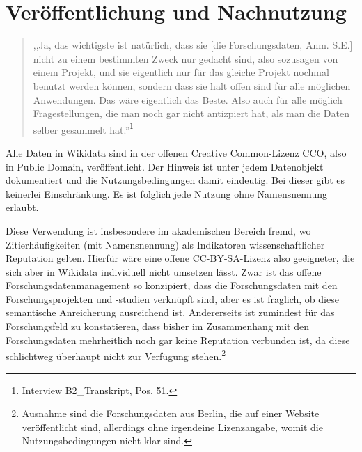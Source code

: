 \section{Veröffentlichung und Nachnutzung}

\begin{quote}
    ,,Ja, das wichtigste ist natürlich, dass sie [die Forschungsdaten, Anm. S.E.] nicht zu einem bestimmten Zweck nur gedacht sind, also sozusagen von einem Projekt, und sie eigentlich nur für das gleiche Projekt nochmal benutzt werden können, sondern dass sie halt offen sind für alle möglichen Anwendungen. Das wäre eigentlich das Beste. Also auch für alle möglich Fragestellungen, die man noch gar nicht antizpiert hat, als man die Daten selber gesammelt hat.''\footnote{Interview B2\_Transkript, Pos. 51.}
\end{quote}

Alle Daten in Wikidata sind in der offenen Creative Common-Lizenz CCO, also in Public Domain, veröffentlicht. Der Hinweis ist unter jedem Datenobjekt dokumentiert und die Nutzungsbedingungen damit eindeutig. Bei dieser gibt es keinerlei Einschränkung. Es ist folglich jede Nutzung ohne Namensnennung erlaubt.

Diese Verwendung ist insbesondere im akademischen Bereich fremd, wo Zitierhäufigkeiten (mit Namensnennung) als Indikatoren wissenschaftlicher Reputation gelten. Hierfür wäre eine offene CC-BY-SA-Lizenz also geeigneter, die sich aber in Wikidata individuell nicht umsetzen lässt. Zwar ist das offene Forschungsdatenmanagement so konzipiert, dass die Forschungsdaten mit den Forschungsprojekten und -studien verknüpft sind, aber es ist fraglich, ob diese semantische Anreicherung ausreichend ist. Andererseits ist zumindest für das Forschungsfeld zu konstatieren, dass bisher im Zusammenhang mit den Forschungsdaten mehrheitlich noch gar keine Reputation verbunden ist, da diese schlichtweg überhaupt nicht zur Verfügung stehen.\footnote{Ausnahme sind die Forschungsdaten aus Berlin, die auf einer Website veröffentlicht sind, allerdings ohne irgendeine Lizenzangabe, womit die Nutzungsbedingungen nicht klar sind.}

